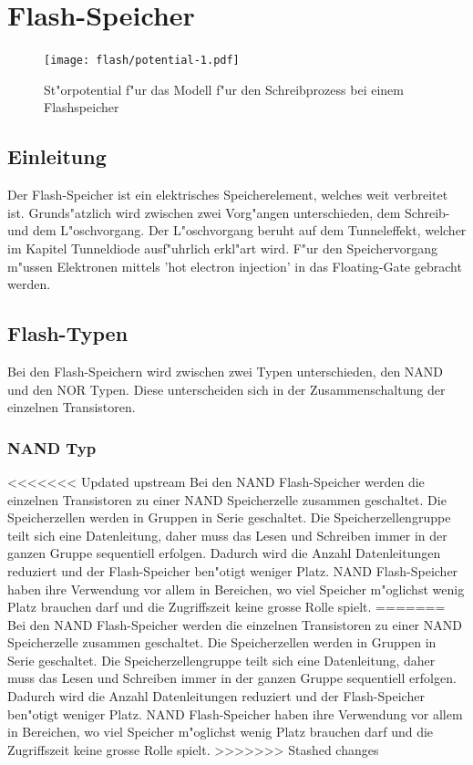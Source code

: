 \chapter{Flash-Speicher\label{chapter:flash}}
\begin{refsection}

\begin{figure}
\centering
\texttt{[image: flash/potential-1.pdf]}
\caption{St"orpotential f"ur das Modell f"ur den Schreibprozess bei
einem Flashspeicher}
\end{figure}

\section{Einleitung}
Der Flash-Speicher ist ein elektrisches Speicherelement, welches
weit verbreitet ist. Grunds"atzlich wird zwischen zwei Vorg"angen
unterschieden, dem Schreib- und dem L"oschvorgang. Der L"oschvorgang
beruht auf dem Tunneleffekt, welcher im Kapitel Tunneldiode ausf"uhrlich
erkl"art wird. F"ur den Speichervorgang m"ussen Elektronen mittels
'hot electron injection' in das Floating-Gate gebracht werden.

\section{Flash-Typen}
Bei den Flash-Speichern wird zwischen zwei Typen unterschieden, den NAND
und den NOR Typen. Diese unterscheiden sich in der Zusammenschaltung
der einzelnen Transistoren.

\subsection{NAND Typ}
<<<<<<< Updated upstream
Bei den NAND Flash-Speicher werden die einzelnen Transistoren zu einer
NAND Speicherzelle zusammen geschaltet. Die Speicherzellen werden in
Gruppen in Serie geschaltet. Die Speicherzellengruppe teilt sich eine
Datenleitung, daher muss das Lesen und Schreiben immer in der ganzen
Gruppe sequentiell erfolgen. Dadurch wird die Anzahl Datenleitungen
reduziert und der Flash-Speicher ben"otigt weniger Platz. NAND
Flash-Speicher haben ihre Verwendung vor allem in Bereichen, wo viel
Speicher m"oglichst wenig Platz brauchen darf und die Zugriffszeit keine
grosse Rolle spielt.
=======
Bei den NAND Flash-Speicher werden die einzelnen Transistoren zu einer NAND Speicherzelle zusammen geschaltet. Die Speicherzellen werden in Gruppen in Serie geschaltet. Die Speicherzellengruppe teilt sich eine Datenleitung, daher muss das Lesen und Schreiben immer in der ganzen Gruppe sequentiell erfolgen. Dadurch wird die Anzahl Datenleitungen reduziert und der Flash-Speicher ben"otigt weniger Platz. NAND Flash-Speicher haben ihre Verwendung vor allem in Bereichen, wo viel Speicher m"oglichst wenig Platz brauchen darf und die Zugriffszeit keine grosse Rolle spielt.
>>>>>>> Stashed changes

\end{refsection}

